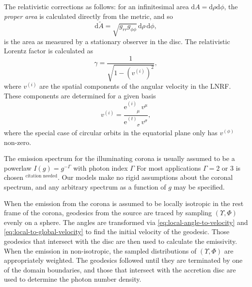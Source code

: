 \documentclass[fleqn,usenatbib]{mnras}
\newcommand{\citneeded}{{\bf \color{red} $^{\text{citation needed}}$}}
\newcommand{\e}{\text{e}}
\renewcommand{\d}{\text{d}}
\newcommand{\utensor}[3]{#1^{#2}_{\phantom{#2}#3}}
\begin{document}
The relativistic corrections as follows: for an infinitesimal area $\d A = \d
\rho\d\phi$, the \textit{proper area} is calculated directly from the metric,
and so
\begin{equation}
    \d\tilde{A} = \sqrt{g_{rr} g_{\phi\phi}}\, \d \rho\, \d \phi,
\end{equation}
is the area as measured by a stationary observer in the disc. The relativistic
Lorentz factor is calculated as
\begin{equation}
    \gamma = \frac{1}{\sqrt{1 - \left(v^{(i)}\right)^2}},
\end{equation}
where $v^{(i)}$ are the spatial components of the angular velocity in the LNRF.
These components are determined for a given basis
\begin{equation}
    v^{(i)} = \frac{\utensor{\e}{(i)}{\mu}\, v^\mu}{\utensor{\e}{(t)}{\sigma}\, v^\sigma},
\end{equation}
where the special case of circular orbits in the equatorial plane only has
$v^{(\phi)}$ non-zero.

The emission spectrum for the illuminating corona is usually assumed to be a
powerlaw $I(g) = g^{-\Gamma}$ with photon index $\Gamma$ For most applications
$\Gamma = 2$ or $3$ is chosen \citneeded. Our models make no rigid assumptions
about the coronal spectrum, and any arbitrary spectrum as a function of $g$ may
be specified.

When the emission from the corona is assumed to be locally isotropic in the rest
frame of the corona, geodesics from the source are traced by sampling
$(\Upsilon, \Phi)$ evenly on a sphere. The angles are transformed via
\eqref{eq:local-angle-to-velocity} and \eqref{eq:local-to-global-velocity} to
find the initial velocity of the geodesic. Those geodesics that intersect with
the disc are then used to calculate the emissivity. When the emission in
non-isotropic, the sampled distributions of $(\Upsilon, \Phi)$ are appropriately
weighted. The geodesics followed until they are terminated by one of the domain
boundaries, and those that intersect with the accretion disc are used to
determine the photon number density.
\end{document}
